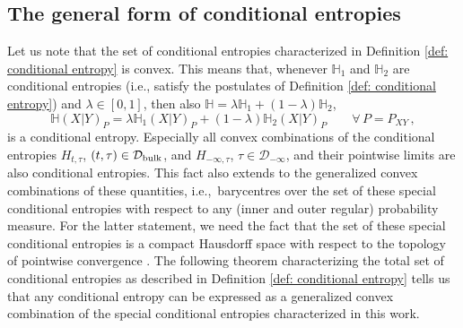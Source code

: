 \documentclass[aps,pra,11pt,onecolumn,nofootinbib,tightenlines]{revtex4-2}
\theoremstyle{definition}
\newcommand{\mc}[1]{\mathcal{#1}}
\newcommand{\mb}[1]{\mathbb{#1}}
\begin{document}

\subsection{The general form of conditional entropies}

Let us note that the set of conditional entropies characterized in Definition \ref{def: conditional entropy} is convex. This means that, whenever $\mb H_1$ and $\mb H_2$ are conditional entropies (i.e., satisfy the postulates of Definition \ref{def: conditional entropy}) and $\lambda\in[0,1]$, then also $\mb H=\lambda\mb H_1+(1-\lambda)\mb H_2$,
\begin{equation}
\mb H(X|Y)_P=\lambda\mb H_1(X|Y)_P+(1-\lambda)\mb H_2(X|Y)_P\qquad\forall\, P=P_{XY}\,,
\end{equation}
is a conditional entropy. Especially all convex combinations of the conditional entropies $H_{t,\tau}$, $(t,\tau)\in\mc D_{\rm bulk}$, and $H_{-\infty,\tau}$, $\tau\in\mc D_{-\infty}$, and their pointwise limits are also conditional entropies. This fact also extends to the generalized convex combinations of these quantities, i.e.,\ barycentres over the set of these special conditional entropies with respect to any (inner and outer regular) probability measure. For the latter statement, we need the fact that the set of these special conditional entropies is a compact Hausdorff space with respect to the topology of pointwise convergence \cite[Proposition 8.5]{fritz2023abstractII}. The following theorem characterizing the total set of conditional entropies as described in Definition \ref{def: conditional entropy} tells us that any conditional entropy can be expressed as a generalized convex combination of the special conditional entropies characterized in this work.
\end{document}
